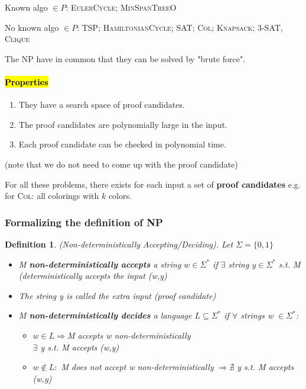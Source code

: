 \documentclass[a3paper, 8pt]{extarticle}
\newtheorem*{definition}{Definition}
\begin{document}
\begin{multicols*}{6}
Known algo $\in P$: \textsc{EulerCycle}; \textsc{MinSpanTreeO}

No known algo $\in P$: \textsc{TSP; HamiltonianCycle; SAT; Col; Knapsack; 3-SAT, Clique}

The NP have in common that they can be solved by "brute force".

\paragraph{\hl{Properties}}
\begin{enumerate}
    \item They have a search space of proof candidates.
    \item The proof candidates are polynomially large in the input.
    \item Each proof candidate can be checked in polynomial time.
\end{enumerate}

(note that we do not need to come up with the proof candidate)

For all these problems, there exists for each input a set of \textbf{proof candidates} e.g. for \textsc{Col}: all colorings with $k$ colors.

\subsubsection{Formalizing the definition of NP}
\begin{definition}
    (Non-deterministically Accepting/Deciding). Let $\Sigma=\{0,1\}$ 
    \begin{itemize}
        \item M \textbf{non-deterministically accepts} a string $w \in \Sigma^*$ if $\exists$ string $y \in \Sigma^*$ s.t. M (deterministically accepts the input (w,y)
        \item The string y is called the extra input (proof candidate)
        \item M \textbf{non-deterministically decides} a language $L \subseteq \Sigma^*$ if $\forall$ strings w $\in \Sigma^*$:\begin{itemize}
            \item $w \in L \Rightarrow$M accepts w non-deterministically\\
            \* $\exists$ y s.t. M accepts (w,y)
            \item $w \notin L:$ M does not accept w non-deterministically 
            $\Rightarrow \nexists$ y s.t. M accepts (w,y)
        \end{itemize}
    \end{itemize}
\end{definition}


\end{multicols*}
\end{document}
